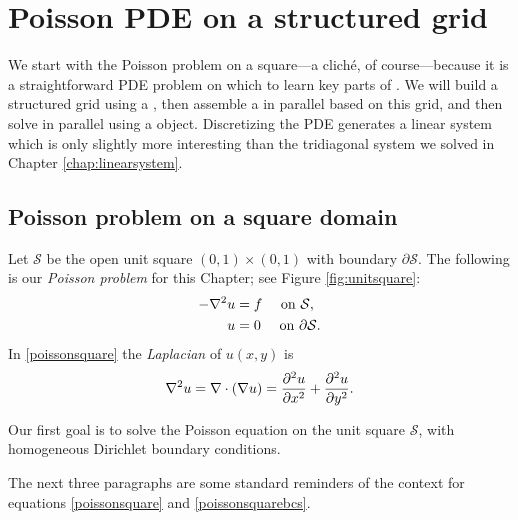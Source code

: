 
\chapter{Poisson PDE on a structured grid}
\label{chap:structured}

We start with the Poisson problem on a square---a clich\'e, of course---because it is a straightforward PDE problem on which to learn key parts of \PETSc.  We will build a structured grid using a \pDMDA, then assemble a \pMat in parallel based on this grid, and then solve in parallel using a \pKSP object.  Discretizing the PDE generates a linear system which is only slightly more interesting than the tridiagonal system we solved in Chapter \ref{chap:linearsystem}.

\section{Poisson problem on a square domain}

Let $\mathcal{S}$ be the open unit square $(0,1)\times(0,1)$ with boundary $\partial\mathcal{S}$.  The following is our \emph{Poisson problem} for this Chapter;  see Figure \ref{fig:unitsquare}:
\begin{align}
- \nabla^2 u &= f \quad \text{ on } \mathcal{S}, \label{poissonsquare} \\
u &= 0 \quad \text{ on } \partial \mathcal{S}. \label{poissonsquarebcs}
\end{align}
In \eqref{poissonsquare} the \emph{Laplacian} of $u(x,y)$ is
    $$\nabla^2 u = \nabla\cdot(\nabla u) = \frac{\partial^2 u}{\partial x^2} + \frac{\partial^2 u}{\partial y^2}.$$

\begin{marginfigure}
\caption{Our first goal is to solve the Poisson equation on the unit square $\mathcal{S}$, with homogeneous Dirichlet boundary conditions.}
\label{fig:unitsquare}
\end{marginfigure}

The next three paragraphs are some standard reminders of the context for equations \eqref{poissonsquare} and \eqref{poissonsquarebcs}.

